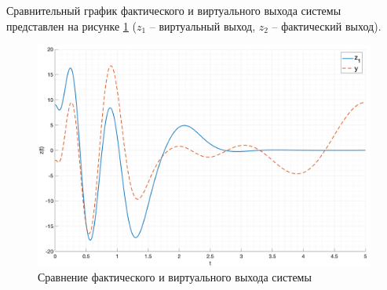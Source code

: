 Сравнительный график фактического и виртуального выхода системы представлен на рисунке \ref{fig:task3_z1_cmp} ($z_1$ -- виртуальный выход, $z_2$ -- фактический выход).
\begin{figure}[ht!]
    \centering
    \includegraphics[width=\textwidth]{media/plots/task3_z1_cmp.png}
    \caption{Сравнение фактического и виртуального выхода системы}
    \label{fig:task3_z1_cmp}
\end{figure}

